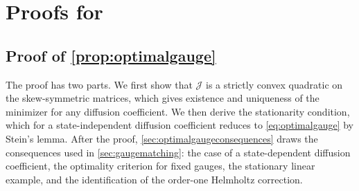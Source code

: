 \documentclass{article} %
\begin{document}
\section{Proofs for \texorpdfstring{}{Section 4}}\label{sec:proofsgm}

\subsection{Proof of \texorpdfstring{\cref{prop:optimalgauge}}{Proposition 3}}\label{sec:proofoptimalgauge}

The proof has two parts. We first show that $\mathcal{J}$ is a strictly convex quadratic on the skew-symmetric matrices, which gives existence and uniqueness of the minimizer for any diffusion coefficient. We then derive the stationarity condition, which for a state-independent diffusion coefficient reduces to \cref{eq:optimalgauge} by Stein's lemma. After the proof, \cref{sec:optimalgaugeconsequences} draws the consequences used in \cref{sec:gaugematching}: the case of a state-dependent diffusion coefficient, the optimality criterion for fixed gauges, the stationary linear example, and the identification of the order-one Helmholtz correction.
\end{document}
